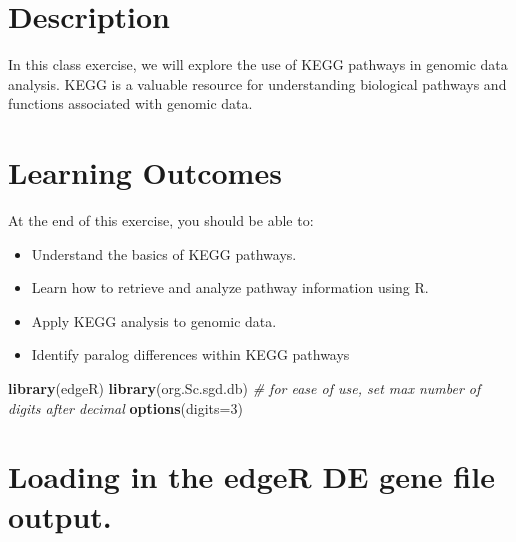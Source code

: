 \documentclass[
]{book}
\newenvironment{Shaded}{\begin{snugshade}}{\end{snugshade}}
\newcommand{\AttributeTok}[1]{\textcolor[rgb]{0.13,0.29,0.53}{#1}}
\newcommand{\CommentTok}[1]{\textcolor[rgb]{0.56,0.35,0.01}{\textit{#1}}}
\newcommand{\DecValTok}[1]{\textcolor[rgb]{0.00,0.00,0.81}{#1}}
\newcommand{\FunctionTok}[1]{\textcolor[rgb]{0.13,0.29,0.53}{\textbf{#1}}}
\newcommand{\NormalTok}[1]{#1}
\providecommand{\tightlist}{%
  \setlength{\itemsep}{0pt}\setlength{\parskip}{0pt}}
\begin{document}
\hypertarget{description-7}{%
\section{Description}\label{description-7}}

In this class exercise, we will explore the use of KEGG pathways in genomic data analysis. KEGG is a valuable resource for understanding biological pathways and functions associated with genomic data.

\hypertarget{learning-outcomes-7}{%
\section{Learning Outcomes}\label{learning-outcomes-7}}

At the end of this exercise, you should be able to:

\begin{itemize}
\tightlist
\item
  Understand the basics of KEGG pathways.
\item
  Learn how to retrieve and analyze pathway information using R.
\item
  Apply KEGG analysis to genomic data.
\item
  Identify paralog differences within KEGG pathways
\end{itemize}

\begin{Shaded}
\begin{Highlighting}[]
\FunctionTok{library}\NormalTok{(edgeR)}
\FunctionTok{library}\NormalTok{(org.Sc.sgd.db)}
\CommentTok{\# for ease of use, set max number of digits after decimal}
\FunctionTok{options}\NormalTok{(}\AttributeTok{digits=}\DecValTok{3}\NormalTok{)}
\end{Highlighting}
\end{Shaded}

\hypertarget{loading-in-the-edger-de-gene-file-output.}{%
\section{Loading in the edgeR DE gene file output.}\label{loading-in-the-edger-de-gene-file-output.}}
\end{document}
